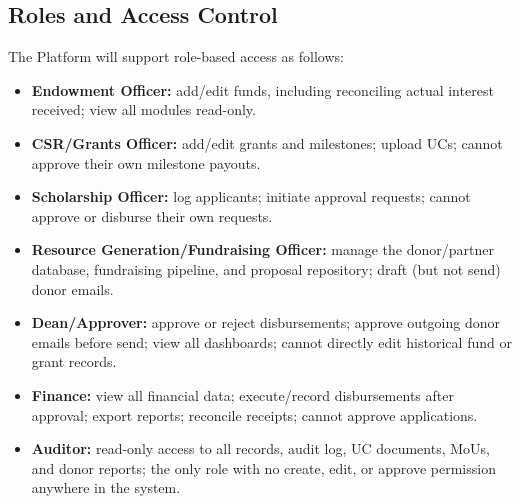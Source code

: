 \documentclass[11pt]{article}
\begin{document}
\subsection{Roles and Access Control}
\label{sec:roles}
The Platform will support role-based access as follows:
\begin{itemize}[leftmargin=1.4em, itemsep=3pt]
\item \textbf{Endowment Officer:} add/edit funds, including reconciling actual interest received; view all modules read-only.
\item \textbf{CSR/Grants Officer:} add/edit grants and milestones; upload UCs; cannot approve their own milestone payouts.
\item \textbf{Scholarship Officer:} log applicants; initiate approval requests; cannot approve or disburse their own requests.
\item \textbf{Resource Generation/Fundraising Officer:} manage the donor/partner database, fundraising pipeline, and proposal repository; draft (but not send) donor emails.
\item \textbf{Dean/Approver:} approve or reject disbursements; approve outgoing donor emails before send; view all dashboards; cannot directly edit historical fund or grant records.
\item \textbf{Finance:} view all financial data; execute/record disbursements after approval; export reports; reconcile receipts; cannot approve applications.
\item \textbf{Auditor:} read-only access to all records, audit log, UC documents, MoUs, and donor reports; the only role with no create, edit, or approve permission anywhere in the system.
\end{itemize}
\end{document}
